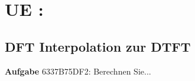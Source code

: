 \newpage
\section{UE : }


\clearpage
\subsection{DFT Interpolation zur DTFT}
\label{sec:6337B75DF2}
\begin{Ziel}
\end{Ziel}
\textbf{Aufgabe} {\tiny 6337B75DF2}: Berechnen Sie...
\begin{Werkzeug}
\end{Werkzeug}
\begin{Ansatz}
\end{Ansatz}
\begin{ExCalc}
\end{ExCalc}
\begin{Loesung}
\end{Loesung}
